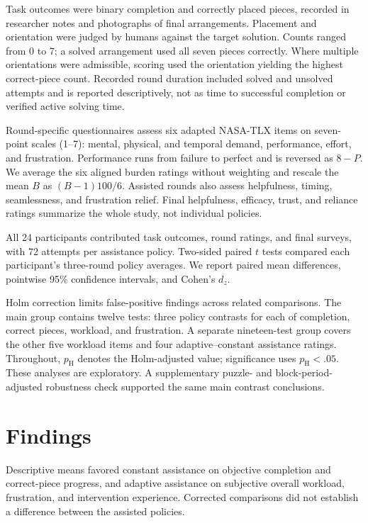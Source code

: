 \documentclass[sigconf,anonymous]{aamas}
\begin{document}
Task outcomes were binary completion and correctly placed pieces, recorded in researcher notes and photographs of final arrangements. Placement and orientation were judged by humans against the target solution. Counts ranged from 0 to 7; a solved arrangement used all seven pieces correctly. Where multiple orientations were admissible, scoring used the orientation yielding the highest correct-piece count. Recorded round duration included solved and unsolved attempts and is reported descriptively, not as time to successful completion or verified active solving time.

Round-specific questionnaires assess six adapted NASA-TLX items \cite{hart2006} on seven-point scales (1--7): mental, physical, and temporal demand, performance, effort, and frustration. Performance runs from failure to perfect and is reversed as $8-P$. We average the six aligned burden ratings without weighting and rescale the mean $B$ as $(B-1)100/6$. Assisted rounds also assess helpfulness, timing, seamlessness, and frustration relief. Final helpfulness, efficacy, trust, and reliance ratings summarize the whole study, not individual policies.

All 24 participants contributed task outcomes, round ratings, and final surveys, with 72 attempts per assistance policy. Two-sided paired $t$ tests compared each participant's three-round policy averages. We report paired mean differences, pointwise 95\% confidence intervals, and Cohen's $d_z$.

Holm correction limits false-positive findings across related comparisons. The main group contains twelve tests: three policy contrasts for each of completion, correct pieces, workload, and frustration. A separate nineteen-test group covers the other five workload items and four adaptive--constant assistance ratings. Throughout, $p_{\mathrm{H}}$ denotes the Holm-adjusted value; significance uses $p_{\mathrm{H}}<.05$. These analyses are exploratory. A supplementary puzzle- and block-period-adjusted robustness check supported the same main contrast conclusions.

\section{Findings}

Descriptive means favored constant assistance on objective completion and correct-piece progress, and adaptive assistance on subjective overall workload, frustration, and intervention experience. Corrected comparisons did not establish a difference between the assisted policies.
\end{document}
